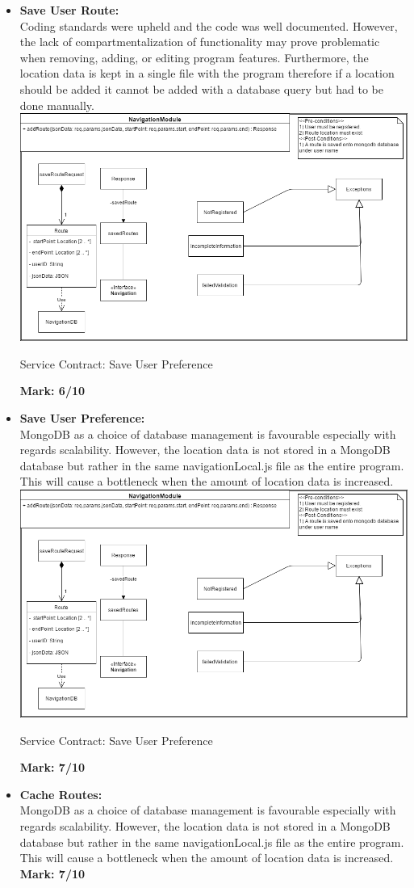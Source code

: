 \begin{itemize}
	
\item \textbf{Save User Route:}\\Coding standards were upheld and the code was well documented. However, the lack of compartmentalization of functionality may prove problematic when  removing, adding, or editing program features. Furthermore, the location data is kept in a single file with the program therefore if a location should be added it cannot be added with a database query but had to be done manually.\\
\includegraphics[scale=0.5]{SaveRoute.png}
\caption{Service Contract: Save User Preference}
	\textbf{Mark: 6/10}
\item \textbf{Save User Preference:}\\MongoDB as a choice of database management is favourable especially with regards scalability. However, the location data is not stored in a MongoDB database but rather in the same navigationLocal.js file as the entire program. This will cause a bottleneck when the amount of location data is increased.\\
\includegraphics[scale=0.5]{SaveRoute.png}
\caption{Service Contract: Save User Preference}
	\textbf{Mark: 7/10}
\item \textbf{Cache Routes:}\\MongoDB as a choice of database management is favourable especially with regards scalability. However, the location data is not stored in a MongoDB database but rather in the same navigationLocal.js file as the entire program. This will cause a bottleneck when the amount of location data is increased.\\
	\textbf{Mark: 7/10}
	
\end{itemize}
